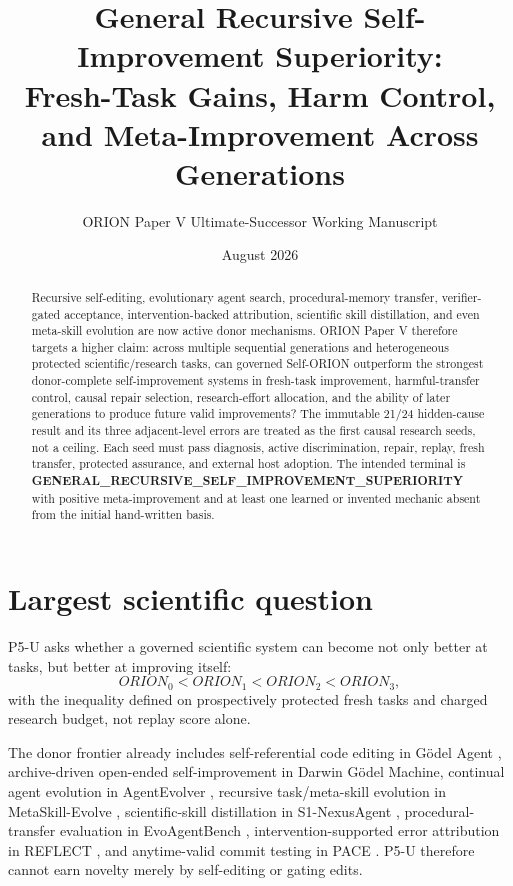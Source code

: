 \documentclass[11pt]{article}
\title{General Recursive Self-Improvement Superiority:\\
Fresh-Task Gains, Harm Control, and Meta-Improvement Across Generations}
\author{ORION Paper V Ultimate-Successor Working Manuscript}
\date{August 2026}
\begin{document}
\maketitle

\begin{abstract}
Recursive self-editing, evolutionary agent search, procedural-memory transfer, verifier-gated acceptance, intervention-backed attribution, scientific skill distillation, and even meta-skill evolution are now active donor mechanisms. ORION Paper V therefore targets a higher claim: across multiple sequential generations and heterogeneous protected scientific/research tasks, can governed Self-ORION outperform the strongest donor-complete self-improvement systems in fresh-task improvement, harmful-transfer control, causal repair selection, research-effort allocation, and the ability of later generations to produce future valid improvements? The immutable 21/24 hidden-cause result and its three adjacent-level errors are treated as the first causal research seeds, not a ceiling. Each seed must pass diagnosis, active discrimination, repair, replay, fresh transfer, protected assurance, and external host adoption. The intended terminal is \textbf{GENERAL\_RECURSIVE\_SELF\_IMPROVEMENT\_SUPERIORITY} with positive meta-improvement and at least one learned or invented mechanic absent from the initial hand-written basis.
\end{abstract}

\section{Largest scientific question}
P5-U asks whether a governed scientific system can become not only better at tasks, but better at improving itself:
\[
ORION_0 < ORION_1 < ORION_2 < ORION_3,
\]
with the inequality defined on prospectively protected fresh tasks and charged research budget, not replay score alone.

The donor frontier already includes self-referential code editing in G\"odel Agent \cite{godel2025}, archive-driven open-ended self-improvement in Darwin G\"odel Machine, continual agent evolution in AgentEvolver \cite{agentevolver2025}, recursive task/meta-skill evolution in MetaSkill-Evolve \cite{metaskill2026}, scientific-skill distillation in S1-NexusAgent \cite{nexus2026}, procedural-transfer evaluation in EvoAgentBench \cite{evoagentbench2026}, intervention-supported error attribution in REFLECT \cite{reflect2026}, and anytime-valid commit testing in PACE \cite{pace2026}. P5-U therefore cannot earn novelty merely by self-editing or gating edits.
\end{document}
